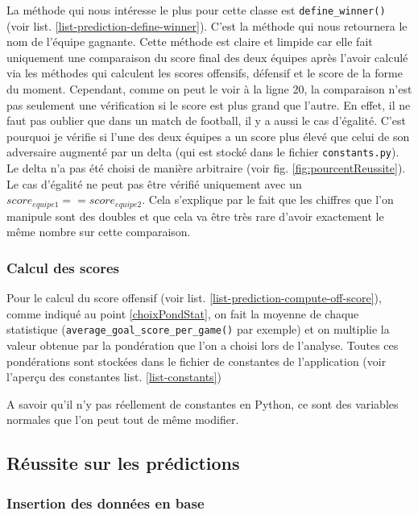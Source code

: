 \documentclass[a4paper,14pt]{extarticle}
\begin{document}
{La méthode qui nous intéresse le plus pour cette classe est \texttt{define\_winner()} (voir list. \ref{list-prediction-define-winner}). C'est la méthode qui nous retournera le nom de l'équipe gagnante. Cette méthode est claire et limpide car elle fait uniquement une comparaison du score final des deux équipes après l'avoir calculé via les méthodes qui calculent les scores offensifs, défensif et le score de la forme du moment. 
Cependant, comme on peut le voir à la ligne 20, la comparaison n'est pas seulement une vérification si le score est plus grand que l'autre. En effet, il ne faut pas oublier que dans un match de football, il y a aussi le cas d'égalité. C'est pourquoi je vérifie si l'une des deux équipes a un score plus élevé que celui de son adversaire augmenté par un delta (qui est stocké dans le fichier \texttt{constants.py}). Le delta n'a pas été choisi de manière arbitraire (voir fig. \ref{fig:pourcentReussite}). Le cas d'égalité ne peut pas être vérifié uniquement avec un $score_{equipe1} == score_{equipe2}$. Cela s'explique par le fait que les chiffres que l'on manipule sont des doubles et que cela va être très rare d'avoir exactement le même nombre sur cette comparaison.


\subsubsection{Calcul des scores}

Pour le calcul du score offensif (voir list. \ref{list-prediction-compute-off-score}), comme indiqué au point \ref{choixPondStat}, on fait la moyenne de chaque statistique (\texttt{average\_goal\_score\_per\_game()} par exemple) et on multiplie la valeur obtenue par la pondération que l'on a choisi lors de l'analyse. Toutes ces pondérations sont stockées dans le fichier de constantes de l'application (voir l'aperçu des constantes list. \ref{list-constants})

A savoir qu'il n'y pas réellement de constantes en Python, ce sont des variables normales que l'on peut tout de même modifier.

\subsection{Réussite sur les prédictions}

\subsubsection{Insertion des données en base}

}
\end{document}

